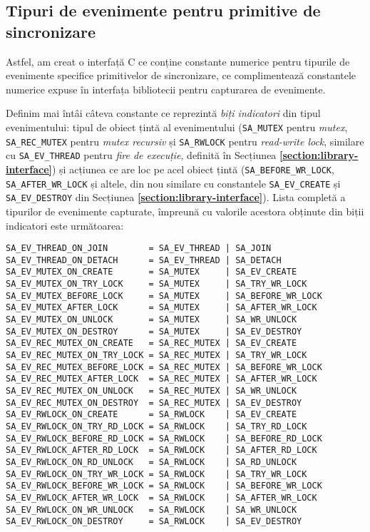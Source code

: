 \subsection{Tipuri de evenimente pentru primitive de sincronizare}

Astfel, am creat
o interfață C ce conține constante numerice pentru tipurile de
evenimente specifice primitivelor de sincronizare, ce complimentează
constantele numerice expuse în interfața bibliotecii pentru capturarea
de evenimente.

Definim mai întâi câteva constante ce reprezintă
\textit{biți indicatori} din tipul evenimentului: tipul de obiect
țintă al evenimentului (\lstinline{SA_MUTEX} pentru \textit{mutex},
\lstinline{SA_REC_MUTEX} pentru \textit{mutex recursiv} și
\lstinline{SA_RWLOCK} pentru \textit{read-write lock}, similare cu
\lstinline{SA_EV_THREAD} pentru \textit{fire de execuție}, definită în
Secțiunea \textbf{\ref{section:library-interface}}) și acțiunea ce are
loc pe acel obiect țintă (\lstinline{SA_BEFORE_WR_LOCK},
\lstinline{SA_AFTER_WR_LOCK} și altele, din nou similare cu constantele
\lstinline{SA_EV_CREATE} și \lstinline{SA_EV_DESTROY} din Secțiunea
\textbf{\ref{section:library-interface}}). Lista completă a tipurilor de
evenimente capturate, împreună cu valorile acestora obținute din biții
indicatori este următoarea:

\begin{lstlisting}[caption=Tipurile de evenimente pentru primitivele de
                           sincronizare, label=code:syan-event-types]
SA_EV_THREAD_ON_JOIN        = SA_EV_THREAD | SA_JOIN
SA_EV_THREAD_ON_DETACH      = SA_EV_THREAD | SA_DETACH
SA_EV_MUTEX_ON_CREATE       = SA_MUTEX     | SA_EV_CREATE
SA_EV_MUTEX_ON_TRY_LOCK     = SA_MUTEX     | SA_TRY_WR_LOCK
SA_EV_MUTEX_BEFORE_LOCK     = SA_MUTEX     | SA_BEFORE_WR_LOCK
SA_EV_MUTEX_AFTER_LOCK      = SA_MUTEX     | SA_AFTER_WR_LOCK
SA_EV_MUTEX_ON_UNLOCK       = SA_MUTEX     | SA_WR_UNLOCK
SA_EV_MUTEX_ON_DESTROY      = SA_MUTEX     | SA_EV_DESTROY
SA_EV_REC_MUTEX_ON_CREATE   = SA_REC_MUTEX | SA_EV_CREATE
SA_EV_REC_MUTEX_ON_TRY_LOCK = SA_REC_MUTEX | SA_TRY_WR_LOCK
SA_EV_REC_MUTEX_BEFORE_LOCK = SA_REC_MUTEX | SA_BEFORE_WR_LOCK
SA_EV_REC_MUTEX_AFTER_LOCK  = SA_REC_MUTEX | SA_AFTER_WR_LOCK
SA_EV_REC_MUTEX_ON_UNLOCK   = SA_REC_MUTEX | SA_WR_UNLOCK
SA_EV_REC_MUTEX_ON_DESTROY  = SA_REC_MUTEX | SA_EV_DESTROY
SA_EV_RWLOCK_ON_CREATE      = SA_RWLOCK    | SA_EV_CREATE
SA_EV_RWLOCK_ON_TRY_RD_LOCK = SA_RWLOCK    | SA_TRY_RD_LOCK
SA_EV_RWLOCK_BEFORE_RD_LOCK = SA_RWLOCK    | SA_BEFORE_RD_LOCK
SA_EV_RWLOCK_AFTER_RD_LOCK  = SA_RWLOCK    | SA_AFTER_RD_LOCK
SA_EV_RWLOCK_ON_RD_UNLOCK   = SA_RWLOCK    | SA_RD_UNLOCK
SA_EV_RWLOCK_ON_TRY_WR_LOCK = SA_RWLOCK    | SA_TRY_WR_LOCK
SA_EV_RWLOCK_BEFORE_WR_LOCK = SA_RWLOCK    | SA_BEFORE_WR_LOCK
SA_EV_RWLOCK_AFTER_WR_LOCK  = SA_RWLOCK    | SA_AFTER_WR_LOCK
SA_EV_RWLOCK_ON_WR_UNLOCK   = SA_RWLOCK    | SA_WR_UNLOCK
SA_EV_RWLOCK_ON_DESTROY     = SA_RWLOCK    | SA_EV_DESTROY
\end{lstlisting}
